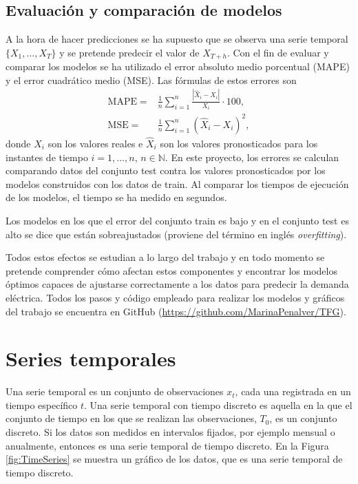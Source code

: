 \documentclass[12pt,twoside]{article}
\newcommand{\abs}[1]{\ensuremath{|#1|}}
\begin{document}
\subsection{Evaluación y comparación de modelos}
A la hora de hacer predicciones se ha supuesto que se observa una serie temporal $\{X_1, \dotsc, X_T\}$ y se pretende predecir el valor de $X_{T+h}$. Con el fin de evaluar y comparar los modelos se ha utilizado el error absoluto medio porcentual (MAPE) y el error cuadrático medio (MSE). Las fórmulas de estos errores son
\begin{align*}
    \text{MAPE} \;=&\; \frac{1}{n}\sum_{i=1}^{n} \frac{\abs{\hat{X}_i - X_i}}{X_i}\cdot 100, \\
    \text{MSE} \;=&\; \frac{1}{n}\sum_{i=1}^n (\hat{X}_i - X_i)^2,
\end{align*}
donde $X_i$ son los valores reales e $\hat{X}_i$ son los valores pronosticados para los instantes de tiempo $i=1,\dotsc, n$, $n\in \mathbb{N}$. En este proyecto, los errores se calculan comparando datos del conjunto test contra los valores pronosticados por los modelos construidos con los datos de train. Al comparar los tiempos de ejecución de los modelos, el tiempo se ha medido en segundos.

Los modelos en los que el error del conjunto train es bajo y en el conjunto test es alto se dice que están sobreajustados (proviene del término en inglés \emph{overfitting}).




Todos estos efectos se estudian a lo largo del trabajo y en todo momento se pretende comprender cómo afectan estos componentes y encontrar los modelos óptimos capaces de ajustarse correctamente a los datos para predecir la demanda eléctrica. Todos los pasos y código empleado para realizar los modelos y gráficos del trabajo se encuentra en GitHub (\href{https://github.com/MarinaPenalver/TFG}{https://github.com/MarinaPenalver/TFG}).







\newpage
\section{Series temporales}
Una serie temporal es un conjunto de observaciones $x_t$, cada una registrada en un tiempo específico $t$. Una serie temporal con tiempo discreto es aquella en la que el conjunto de tiempo en los que se realizan las observaciones, $T_0$, es un conjunto discreto. Si los datos son medidos en intervalos fijados, por ejemplo mensual o anualmente, entonces es una serie temporal de tiempo discreto. En la Figura \ref{fig:TimeSeries} se muestra un gráfico de los datos, que es una serie temporal de tiempo discreto.
\end{document}
